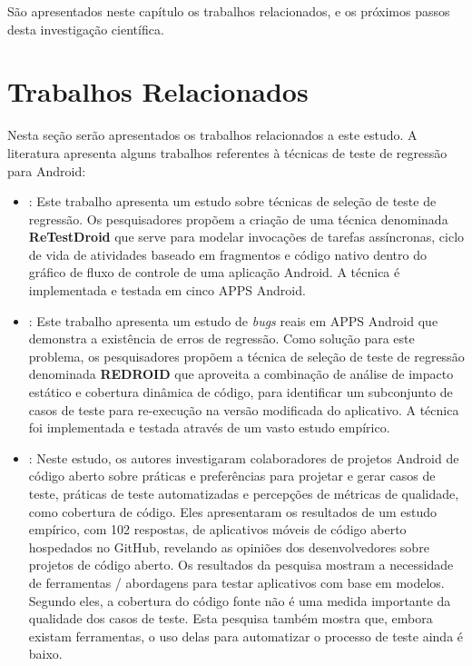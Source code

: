\acresetall
São apresentados neste capítulo os trabalhos relacionados, e os próximos passos desta investigação científica.

\section{Trabalhos Relacionados}

Nesta seção serão apresentados os trabalhos relacionados a este estudo. A literatura apresenta alguns trabalhos referentes à técnicas de teste de regressão para Android:

\begin{itemize}
    
    \item \cite{8377661}: Este trabalho apresenta um estudo sobre técnicas de seleção de teste de regressão. Os pesquisadores propõem a criação de uma técnica denominada \textbf{ReTestDroid} que serve para modelar invocações de tarefas assíncronas, ciclo de vida de atividades baseado em fragmentos e código nativo dentro do gráfico de fluxo de controle de uma aplicação Android. A técnica é implementada e testada em cinco \ac{APPS} Android.
    
    \item \cite{Do2016RedroidAR}: Este trabalho apresenta um estudo de \textit{bugs} reais em \ac{APPS} Android que demonstra a existência de erros de regressão. Como solução para este problema, os pesquisadores propõem a técnica de seleção de teste de regressão denominada \textbf{REDROID} que aproveita a combinação de análise de impacto estático e cobertura dinâmica de código, para identificar um subconjunto de casos de teste para re-execução na versão modificada do aplicativo. A técnica foi implementada e testada através de um vasto estudo empírico.
    
    \item \cite{8094467}: Neste estudo, os autores investigaram colaboradores de projetos Android de código aberto sobre práticas e preferências para projetar e gerar casos de teste, práticas de teste automatizadas e percepções de métricas de qualidade, como cobertura de código. Eles apresentaram os resultados de um estudo empírico, com 102 respostas, de aplicativos móveis de código aberto hospedados no GitHub, revelando as opiniões dos desenvolvedores sobre projetos de código aberto. Os resultados da pesquisa mostram a necessidade de ferramentas / abordagens para testar aplicativos com base em modelos. Segundo eles, a cobertura do código fonte não é uma medida importante da qualidade dos casos de teste. Esta pesquisa também mostra que, embora existam ferramentas, o uso delas para automatizar o processo de teste ainda é baixo.
    

\end{itemize}
